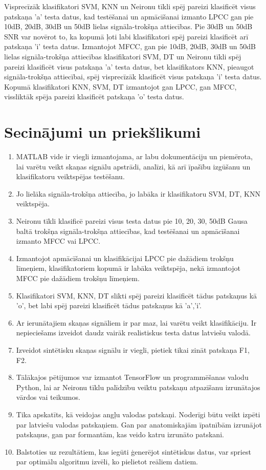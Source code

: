 \documentclass[12pt,paper=A4]{report}
\begin{document}
Visprecīzāk klasifikatori SVM, KNN un Neironu tīkli spēj pareizi klasificēt visus patskaņa 'a' testa datus, kad testēšanai un apmācīšanai izmanto LPCC gan pie 10dB, 20dB, 30dB un 50dB lielas signāla-trokšņa attiecības. Pie 30dB un 50dB SNR var novērot to, ka kopumā ļoti labi klasifikatori spēj pareizi klasificēt arī patskaņa 'i' testa datus.
Izmantojot MFCC, gan pie 10dB, 20dB, 30dB un 50dB lielas signāla-trokšņa attiecības klasifikatori SVM, DT un Neironu tīkli spēj pareizi klasificēt visus patskaņa 'a' testa datus, bet klasifikators KNN, pieaugot signāla-trokšņa attiecībai,
spēj visprecīzāk klasificēt visus patskaņa 'i' testa datus. 
Kopumā klasifikatori KNN, SVM, DT izmantojot gan LPCC, gan MFCC, vissliktāk spēja pareizi klasificēt patskaņa 'o' testa datus. 

\chapter*{Secinājumi un priekšlikumi}
\begin{enumerate}
\item MATLAB vide ir viegli izmantojama, ar labu dokumentāciju un piemērota, lai varētu veikt skaņas signālu apstrādi, analīzi, kā arī īpašību izgūšanu un klasifikatoru veiktspējas testēšanu. 
\item Jo lielāka signāla-trokšņa attiecība, jo labāka ir klasifikatoru SVM, DT, KNN veiktspēja.
\item Neironu tīkli klasificē pareizi visus testa datus pie 10, 20, 30, 50dB Gausa baltā trokšņa signāla-trokšņa attiecības, kad testēšanai un apmācīšanai izmanto MFCC vai LPCC. 
\item Izmantojot apmācīšanai un klasifikācijai LPCC pie dažādiem trokšņu līmeņiem, klasifikatoriem kopumā ir labāka veiktspēja, nekā izmantojot MFCC pie dažādiem trokšņu līmeņiem. 
\item Klasifikatori SVM, KNN, DT slikti spēj pareizi klasificēt tādus patskaņus kā 'o', bet labi spēj pareizi klasificēt tādus patskaņus kā 'a','i'.
\item Ar ierunātajiem skaņas signāliem ir par maz, lai varētu veikt klasifikāciju. Ir nepieciešams izveidot daudz vairāk realistiskus testa datus latviešu valodā.
\item Izveidot sintētisku skaņas signālu ir viegli, pietiek tikai zināt patskaņa F1, F2. 
\item Tālākajos pētijumos var izmantot TensorFlow un programmēšanas valodu Python, lai ar Neironu tīklu palīdzību veiktu patskaņu atpazīšanu izrunātajos vārdos vai teikumos. 
\item Tika apskatīts, kā veidojas angļu valodas patskaņi. Noderīgi būtu veikt izpēti par
latviešu valodas patskaņiem. Gan par anatomiskajām īpatnībām izrunājot patskaņus, gan 
par formantām, kas veido katru izrunāto patskani.
\item Balstoties uz rezultātiem, kas iegūti ģenerējot sintētiskus datus, var spriest par optimālu algoritmu izvēli, ko pielietot reāliem datiem.
\end{enumerate}
\end{document}
